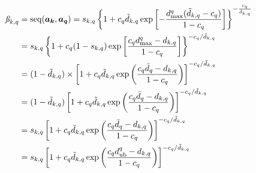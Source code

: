 \documentclass{elsarticle} %
\begin{document}
\begin{align*}
    \textit{\ss}_{k,q} &= 
    \text{seq}(\boldsymbol{a_k}, \boldsymbol{a_q}) = 
    s_{k,q} \left\{
        1 + c_q \tilde{d}_{k,q} \exp\left[
            -\frac{
                d_{\max}^{q}
                (\tilde{d}_{k,q} - c_q)
            }{
                1 - c_q
            }
        \right]
    \right\} ^ {-\frac{c_q}{\tilde{d}_{k,q}}}\\
    &=
    s_{k,q} \left\{
        1 + c_q (1 - s_{k,q}) \exp\left[
            \frac{
                c_q d_{\max}^{q} - d_{k,q}
            }{
                1 - c_q
            }
        \right]
    \right\} ^ {
        - c_q / \tilde{d}_{k,q}
    }\\
    &=
    (1 - \tilde{d}_{k,q})
    \times
    \left[
        1 + c_q \tilde{d}_{k,q} \exp\left(
            \frac{
            c_q \bar{d}_{q} - d_{k,q}
            }{
                1 - c_q
            }
        \right)
    \right] ^ {
        - c_q / \tilde{d}_{k,q}
    }\\
    &=
    (1 - \tilde{d}_{k,q})
    \left[
        1 + c_q \tilde{d}_{k,q} \exp\left(
            \frac{
            c_q \bar{d}_{q} - d_{k,q}
            }{
                1 - c_q
            }
        \right)
    \right] ^ {
        - c_q / \tilde{d}_{k,q}
    }\\
    &=
    s_{k,q}
    \left[
        1 + c_q \tilde{d}_{k,q} \exp\left(
            \frac{
            c_q \bar{d}_{q} - d_{k,q}
            }{
                1 - c_q
            }
        \right)
    \right] ^ {
        - c_q / \tilde{d}_{k,q}
    }\\
    &=
    s_{k,q}
    \left[
        1 + c_q \tilde{d}_{k,q} \exp\left(
            \frac{
            c_q d_{\text{ub}}^{q} - d_{k,q}
            }{
                1 - c_q
            }
        \right)
    \right] ^ {
        - c_q / \tilde{d}_{k,q}
    }\\

\end{align*}
\end{document}
